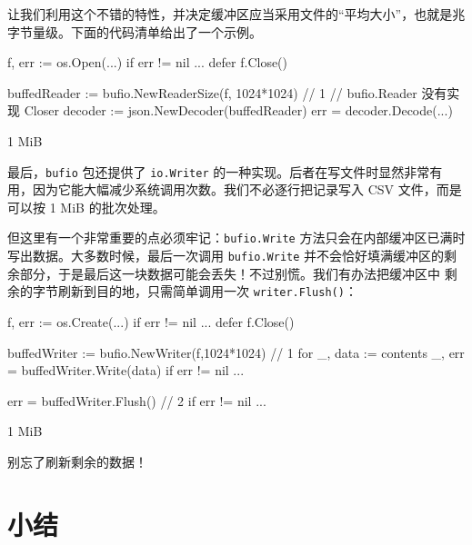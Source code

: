 让我们利用这个不错的特性，并决定缓冲区应当采用文件的“平均大小”，也就是兆字节量级。下面的代码清单给出了一个示例。

\begin{gocode}[title={代码清单 3.24 使用带缓冲的读取器读取文件}]
f, err := os.Open(...)
if err != nil { ... }
defer f.Close()

buffedReader := bufio.NewReaderSize(f, 1024*1024) // 1
// bufio.Reader 没有实现 Closer
decoder := json.NewDecoder(buffedReader)
err = decoder.Decode(...)
\end{gocode}

\begin{codeannotations}
\item 1 MiB
\end{codeannotations}

最后，\texttt{bufio} 包还提供了 \texttt{io.Writer} 的一种实现。后者在写文件时显然非常有用，因为它能大幅减少系统调用次数。我们不必逐行把记录写入 CSV 文件，而是可以按 1 MiB 的批次处理。

但这里有一个非常重要的点必须牢记：\texttt{bufio.Write} 方法只会在内部缓冲区已满时写出数据。大多数时候，最后一次调用 \texttt{bufio.Write} 并不会恰好填满缓冲区的剩余部分，于是最后这一块数据可能会丢失！不过别慌。我们有办法把缓冲区中
剩余的字节刷新到目的地，只需简单调用一次 \texttt{writer.Flush()}：

\begin{gocode}[]
f, err := os.Create(...)
if err != nil { ... }
defer f.Close()

buffedWriter := bufio.NewWriter(f,1024*1024) // 1
for _, data := contents {
  _, err = buffedWriter.Write(data)
  if err != nil { ... }
}

err = buffedWriter.Flush() // 2
if err != nil { ... }
\end{gocode}

\begin{codeannotations}
\item 1 MiB
\item 别忘了刷新剩余的数据！
\end{codeannotations}

\section*{小结}

